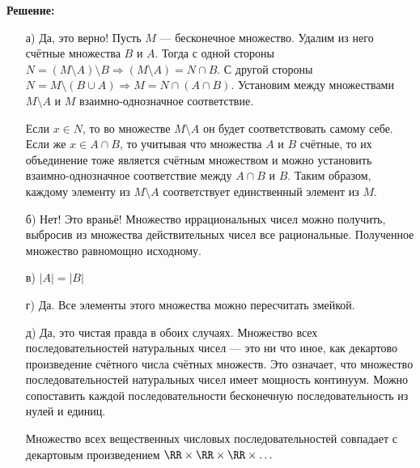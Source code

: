 \documentclass[12pt, a4paper, oneside]{article}
\begin{document}
\textbf{Решение:}
\begin{enumerate}
\item[а)] Да, это верно! Пусть $M$ --- бесконечное множество. Удалим из него счётные множества $B$ и $A$. Тогда с одной стороны $N = (M \setminus A)\setminus B \Rightarrow (M \setminus A) = N \cap B $. С другой стороны $N = M \setminus (B \cup A) \Rightarrow M = N \cap (A \cap B)$. Установим между множествами $M\setminus A$ и $M$ взаимно-однозначное соответствие.

Если $x \in N$, то во множестве  $M\setminus A$ он будет соответствовать самому себе. Если же $x \in A \cap B$, то учитывая что множества $A$ и $B$ счётные, то их объединение тоже является счётным множеством и можно установить взаимно-однозначное соответствие между $A \cap B$ и $B$. Таким образом, каждому элементу из $M\setminus A$ соответствует единственный элемент из $M$.

\item[б)]  Нет! Это враньё! Множество иррациональных чисел можно получить, выбросив из множества действительных чисел все рациональные. Полученное множество равномощно исходному.

\item[в)]  $|A| = |B|$

\item[г)] Да. Все элементы этого множества можно пересчитать змейкой.

\item[д)] Да, это чистая правда в обоих случаях. Множество всех последовательностей натуральных чисел --- это ни что иное, как декартово произведение счётного числа счётных множеств. Это означает, что множество последовательностей натуральных чисел имеет мощность континуум. Можно сопоставить каждой последовательности бесконечную последовательность из нулей и единиц.

Множество всех вещественных числовых последовательностей совпадает с декартовым произведением $\RR \times \RR \times \RR \times \ldots$
\end{enumerate}

\end{document}

